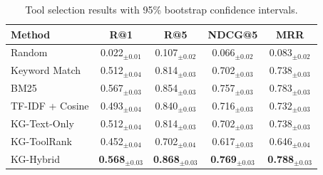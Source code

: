 \begin{table}[t]
\centering
\caption{Tool selection results with 95\% bootstrap confidence intervals.}
\label{tab:results-ci}
\begin{tabular}{lcccc}
\toprule
Method & R@1 & R@5 & NDCG@5 & MRR \\
\midrule
Random & 0.022$_{\pm0.01}$ & 0.107$_{\pm0.02}$ & 0.066$_{\pm0.02}$ & 0.083$_{\pm0.02}$ \\
Keyword Match & 0.512$_{\pm0.04}$ & 0.814$_{\pm0.03}$ & 0.702$_{\pm0.03}$ & 0.738$_{\pm0.03}$ \\
BM25 & 0.567$_{\pm0.03}$ & 0.854$_{\pm0.03}$ & 0.757$_{\pm0.03}$ & 0.783$_{\pm0.03}$ \\
TF-IDF + Cosine & 0.493$_{\pm0.04}$ & 0.840$_{\pm0.03}$ & 0.716$_{\pm0.03}$ & 0.732$_{\pm0.03}$ \\
KG-Text-Only & 0.512$_{\pm0.04}$ & 0.814$_{\pm0.03}$ & 0.702$_{\pm0.03}$ & 0.738$_{\pm0.03}$ \\
KG-ToolRank & 0.452$_{\pm0.04}$ & 0.702$_{\pm0.04}$ & 0.617$_{\pm0.03}$ & 0.646$_{\pm0.04}$ \\
KG-Hybrid & \textbf{0.568$_{\pm0.03}$} & \textbf{0.868$_{\pm0.03}$} & \textbf{0.769$_{\pm0.03}$} & \textbf{0.788$_{\pm0.03}$} \\
\bottomrule
\end{tabular}
\end{table}